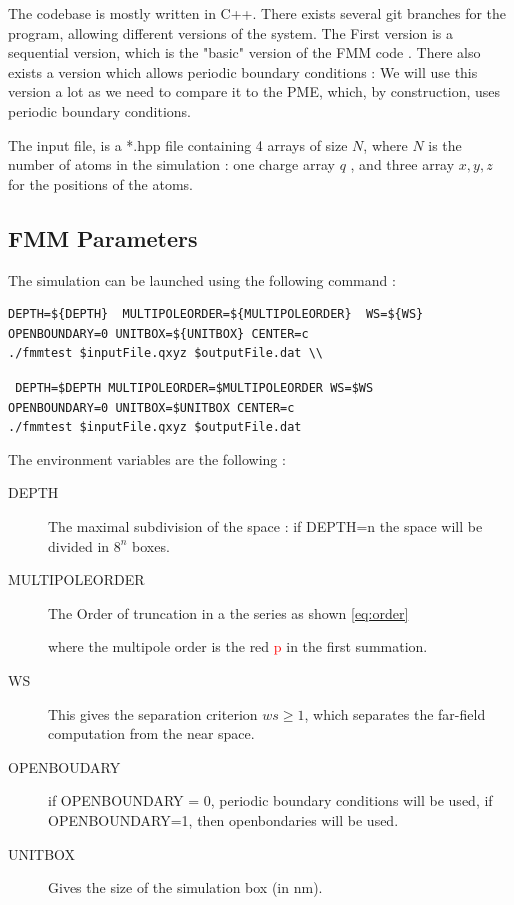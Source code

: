 \documentclass[11pt,twoside,a4paper]{report}
\begin{document}
	The codebase is mostly written in C++.  There exists several git branches for the program, allowing different versions of the system.	
The First version is a sequential version, which is the "basic" version of the FMM code . There also exists a version which allows periodic boundary conditions : We will use this version a lot as we need to compare it to the PME, which, by construction, uses periodic boundary conditions.	

The input file, is a *.hpp file containing 4 arrays of size $N$, where $N$ is the number of atoms in the simulation : one charge array $q$ , and three array $x,y,z$ for the positions of the atoms.

\subsection{FMM Parameters}

The simulation can be launched using the following command : 

\begin{verbatim}
DEPTH=${DEPTH}  MULTIPOLEORDER=${MULTIPOLEORDER}  WS=${WS} 
OPENBOUNDARY=0 UNITBOX=${UNITBOX} CENTER=c 
./fmmtest $inputFile.qxyz $outputFile.dat \\	

\end{verbatim}

{\centering\tt { DEPTH=\${DEPTH}  MULTIPOLEORDER=\${MULTIPOLEORDER}  WS=\${WS} \\ 
OPENBOUNDARY=0 UNITBOX=\${UNITBOX} CENTER=c \\
./fmmtest \$inputFile.qxyz \$outputFile.dat \\					
 }}

The environment variables are the following :

\begin{description}
\item[DEPTH] The maximal subdivision of the space : if DEPTH=n the space will be divided in $8^{n}$ boxes.

\item[MULTIPOLEORDER] The Order of truncation in a the series as shown \ref{eq:order}
	
	where the multipole order is the red \textcolor{red}{p} in the first summation.
	
	
\item[WS] This gives the separation criterion $ws \geq 1$, which separates the far-field computation from the near space.

\item[OPENBOUDARY] if OPENBOUNDARY = 0, periodic boundary conditions will be used, if OPENBOUNDARY=1, then openbondaries will be used.

\item[UNITBOX] Gives the size of the simulation box (in nm).

\end{description}
 	
\end{document}

